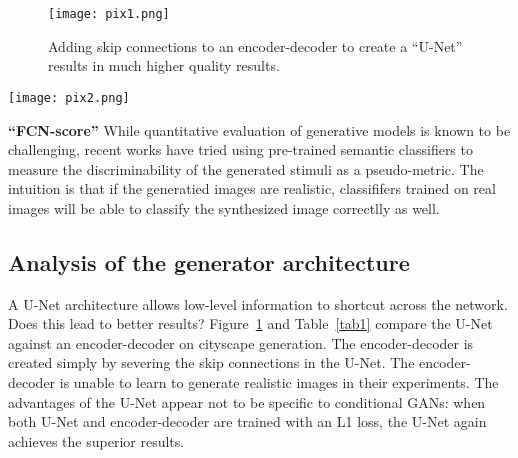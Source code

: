 \documentclass[10pt,twocolumn,letterpaper]{article}
\begin{document}
\begin{figure}
\begin{center}
\texttt{[image: pix1.png]}
\end{center}
\caption{Adding skip connections to an encoder-decoder to create a ``U-Net'' results in much higher quality results.}
\label{fig1}
\end{figure}

\begin{figure*}
\begin{center}
\texttt{[image: pix2.png]}
\end{center}
\caption{Patch size variations. Uncertainty in the output manifests itself differently for different loss functions. Uncertain regions become blurry and desaturated under L1. The $1\times 1$ PixelGAN encourages greater color diversity but has no effect on spatial statistics. The $16\times 16$ PatchGAN creates locally sharp results, but also leads to tiling artifacts beyond the scale it can observe. The $70\times 70$ PatchGAN forces outputs that are sharp, even if incorrect, in both the spatial and spectral (colorfulness) dimensions. The full $286\times 286$ ImageGAN produces results that are visually similar to the  $70\times 70$ PatchGAN, but somewat lower quality according to their FCN-score metric (Table~\ref{tab2}). Please see {\color[gray]{0.6} https://phillipi.github.io/pix2pix/} for additional examples.}
\label{fig2}
\end{figure*}

{\bf ``FCN-score''} While quantitative evaluation of generative models is known to be challenging, recent works have tried using pre-trained semantic classifiers to measure the discriminability of the generated stimuli as a pseudo-metric. The intuition is that if the generatied images are realistic, classififers trained on real images will be able to classify the synthesized image correctlly as well. 

\subsection{Analysis of the generator architecture}

A U-Net architecture allows low-level information to shortcut across the network. Does this lead to better results? Figure~\ref{fig1} and Table~\ref{tab1} compare the U-Net against an encoder-decoder on cityscape generation. The encoder-decoder is created simply by severing the skip connections in the U-Net. The encoder-decoder is unable to learn to generate realistic images in their experiments. The advantages of the U-Net appear not to be specific to conditional GANs: when both U-Net and encoder-decoder are trained with an L1 loss, the U-Net again achieves the superior results.
\end{document}
